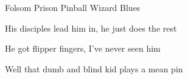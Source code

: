 \begin{SBSong}{Folsom Prison Pinball Wizard Blues}
\begin{SBVerse}
    His disciples lead him in,  he just does the rest 
    
    He got  flipper fingers, I've never seen him  
    
    Well that  dumb and blind kid  plays a mean pin
  \end{SBVerse}
\end{SBSong}
